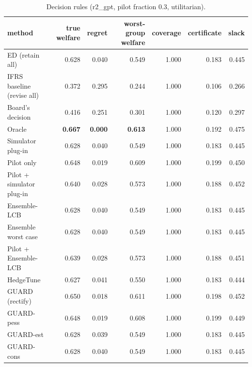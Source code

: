 \begin{table}[t]
\centering
\small
\begin{tabular}{lrrrrrr}
\toprule
method & true welfare & regret & worst-group welfare & coverage & certificate & slack \\
\midrule
ED (retain all) & 0.628 & 0.040 & 0.549 & 1.000 & 0.183 & 0.445 \\
IFRS baseline (revise all) & 0.372 & 0.295 & 0.244 & 1.000 & 0.106 & 0.266 \\
Board's decision & 0.416 & 0.251 & 0.301 & 1.000 & 0.120 & 0.297 \\
Oracle & \textbf{0.667} & \textbf{0.000} & \textbf{0.613} & 1.000 & 0.192 & 0.475 \\
Simulator plug-in & 0.628 & 0.040 & 0.549 & 1.000 & 0.183 & 0.445 \\
Pilot only & 0.648 & 0.019 & 0.609 & 1.000 & 0.199 & 0.450 \\
Pilot + simulator plug-in & 0.640 & 0.028 & 0.573 & 1.000 & 0.188 & 0.452 \\
Ensemble-LCB & 0.628 & 0.040 & 0.549 & 1.000 & 0.183 & 0.445 \\
Ensemble worst case & 0.628 & 0.040 & 0.549 & 1.000 & 0.183 & 0.445 \\
Pilot + Ensemble-LCB & 0.639 & 0.028 & 0.573 & 1.000 & 0.188 & 0.451 \\
HedgeTune & 0.627 & 0.041 & 0.550 & 1.000 & 0.183 & 0.444 \\
GUARD (rectify) & 0.650 & 0.018 & 0.611 & 1.000 & 0.198 & 0.452 \\
GUARD-pess & 0.648 & 0.019 & 0.608 & 1.000 & 0.199 & 0.449 \\
GUARD-est & 0.628 & 0.039 & 0.549 & 1.000 & 0.183 & 0.445 \\
GUARD-cons & 0.628 & 0.040 & 0.549 & 1.000 & 0.183 & 0.445 \\
\bottomrule
\end{tabular}
\caption{Decision rules (r2\_gpt, pilot fraction 0.3, utilitarian).}
\label{tab:methods-utilitarian}
\end{table}
